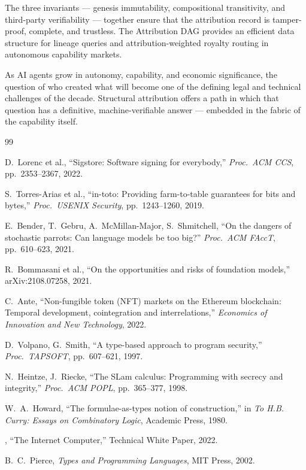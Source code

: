\documentclass[12pt]{article}
\begin{document}
The three invariants — genesis immutability, compositional transitivity, and
third-party verifiability — together ensure that the attribution record is
tamper-proof, complete, and trustless.  The Attribution DAG provides an
efficient data structure for lineage queries and attribution-weighted royalty
routing in autonomous capability markets.

As AI agents grow in autonomy, capability, and economic significance, the
question of who created what will become one of the defining legal and technical
challenges of the decade.  Structural attribution offers a path in which that
question has a definitive, machine-verifiable answer — embedded in the fabric
of the capability itself.

\begin{thebibliography}{99}

D.~Lorenc et al.,
``Sigstore: Software signing for everybody,''
\textit{Proc.\ ACM CCS}, pp.~2353--2367, 2022.

S.~Torres-Arias et al.,
``in-toto: Providing farm-to-table guarantees for bits and bytes,''
\textit{Proc.\ USENIX Security}, pp.~1243--1260, 2019.

E.~Bender, T.~Gebru, A.~McMillan-Major, S.~Shmitchell,
``On the dangers of stochastic parrots: Can language models be too big?''
\textit{Proc.\ ACM FAccT}, pp.~610--623, 2021.

R.~Bommasani et al.,
``On the opportunities and risks of foundation models,''
arXiv:2108.07258, 2021.

C.~Ante,
``Non-fungible token (NFT) markets on the Ethereum blockchain: Temporal
development, cointegration and interrelations,''
\textit{Economics of Innovation and New Technology}, 2022.

D.~Volpano, G.~Smith,
``A type-based approach to program security,''
\textit{Proc.\ TAPSOFT}, pp.~607--621, 1997.

N.~Heintze, J.~Riecke,
``The SLam calculus: Programming with secrecy and integrity,''
\textit{Proc.\ ACM POPL}, pp.~365--377, 1998.

W.~A.~Howard,
``The formulae-as-types notion of construction,''
in \textit{To H.B. Curry: Essays on Combinatory Logic}, Academic Press, 1980.

,
``The Internet Computer,'' Technical White Paper, 2022.

B.~C.~Pierce,
\emph{Types and Programming Languages}, MIT Press, 2002.

\end{thebibliography}
\end{document}
